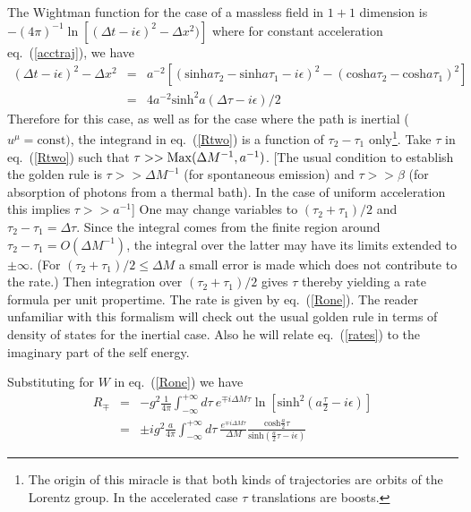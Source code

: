 \documentclass[12pt,oneside]{report}
\begin{document}
  The Wightman function for the
case of a massless field in $1+1$ dimension is $-(4\pi)^{-1} \ln
\left[(\Delta t-i\epsilon)^2 - \Delta x^2) \right]$ where for constant
acceleration eq.~(\ref{acctraj}), we have
\begin{eqnarray} (\Delta
t-i\epsilon)^2 - \Delta x^2 & = &
a^{-2} \left[ \left(\mbox{sinh} a\tau_2 - \mbox{sinh}a \tau_1  
- i\epsilon\right)^2 -
\left(\mbox{cosh} a\tau_2 - \mbox{cosh} a \tau_1\right)^2 \right]
\nonumber \\ & = & 
4a^{-2}
\mbox{sinh}^2 a (\Delta\tau - i \epsilon)/2 \label{Rthree} \end{eqnarray}
Therefore for this case, as well as for the case where the
path is inertial ($u^\mu = \mbox{const})$, the
integrand in eq.~(\ref{Rtwo}) is a function of $\tau_2 - \tau_1$
only\footnote{\label{pgftnote1} The origin of
this miracle is that both kinds of trajectories are orbits of the Lorentz
group. 
In the accelerated case $\tau$ translations are boosts.}.  Take $\tau$
in eq.~(\ref{Rtwo}) such that $\tau >>  {\rm Max} (\Delta M^{-1},a^{-1})$.
[The  usual condition to establish the golden rule is $\tau >> \Delta M
^{-1}$ (for spontaneous emission) and $\tau >> \beta$ (for absorption of
photons from a thermal bath). In the case of uniform acceleration this
implies  $ \tau >> a^{-1}$]
 One may change
variables to $(\tau_2 + \tau_1)/2$ and $\tau_2 - \tau_1 = \Delta \tau$. 
Since the integral comes from the finite region around $\tau_2 - \tau_1 =
O(\Delta M^{-1})$, the integral over the latter may  have its limits extended
to $\pm \infty $. (For $(\tau_2 + \tau_1)/2 \leq \Delta M$  a
small error is made which does not contribute to the rate.) Then 
integration over
$(\tau_2 + \tau_1)/2$ gives $\tau$ thereby yielding a rate formula per unit
propertime. The rate is given by eq.~(\ref{Rone}).  The  reader unfamiliar
with this formalism will check out the usual golden rule in terms of density  of
states for the inertial case.  Also he will relate eq.~(\ref{rates}) to the
imaginary part of the self energy. \par Substituting for $W$ in eq.~(\ref{Rone})
we have \begin{eqnarray} R_{\mp} & = & -g^2 \frac{1}{4\pi}
\int^{+\infty}_{-\infty}\! d\tau \  e^{\mp i \Delta M\tau} \ln
\left[\mbox{sinh}^2 \left(a \frac{\tau}{2} - i \epsilon \right) \right]
\nonumber \\ &=& \pm ig^2 \frac{a}{4\pi}  \int^{+ \infty}_{- \infty} \! d\tau \ 
\frac{e^{\mp i \Delta M \tau}}{\Delta M} \frac{\mbox{cosh} \frac{a}{2}
\tau}{\mbox{sinh} \left( \frac{a}{2} \tau - i \epsilon \right)} \label{Rfour}
\end{eqnarray}
\end{document}
